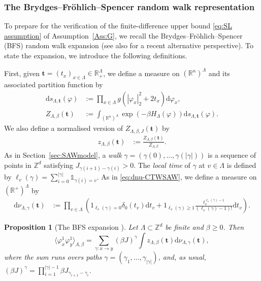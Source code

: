 \documentclass[11pt,a4paper]{article}
\numberwithin{equation}{section}
\theoremstyle{plain}
\newtheorem{Prop}[Thm]{Proposition}
\theoremstyle{definition}
\newcommand\1{\mathds{1}}
\begin{document}
\subsubsection{The Brydges--Fr\"ohlich--Spencer random walk representation}



To prepare for the verification of the finite-difference upper
bound \eqref{eq:SL assumption} of Assumption~\ref{Ass:G}, we recall
the Brydges--Fr\"ohlich--Spencer (BFS) random walk expansion \cite{BFS82} (see also \cite{Lamm23} for a recent alternative perspective).
To state the expansion, we introduce the following definitions.

First, given $\mathbf{t}=(t_x)_{x\in \Lambda}\in \mathbb R_+^\Lambda$,
we define a measure on $(\mathbb R^n)^\Lambda$ and its associated
partition function by
\begin{align}
    \mathrm{d}s_{\Lambda,\mathbf{t}}(\varphi) &:= \prod_{x\in \Lambda}  g(|\varphi_x|^2_2+2t_x)\mathrm{d}\varphi_x ,\\
    Z_{\Lambda,\beta}(\mathbf{t}) &:= \int_{(\mathbb R^n)^\Lambda}\exp (-\beta H_{\Lambda}(\varphi) ) \mathrm{d}s_{\Lambda,\mathbf{t}}(\varphi).
\end{align}
We also define a normalised version of $Z_{\Lambda,\beta,J}(\mathbf{t})$ by
\begin{align}
    z_{\Lambda,\beta}(\mathbf{t}) &:= \frac{Z_{\Lambda,\beta}(\mathbf{t})}{Z_{\Lambda,\beta}}.
\end{align}
As in Section~\ref{sec:SAWmodel}, a
\emph{walk} $\gamma=(\gamma(0),\ldots,\gamma(|\gamma|))$ is a sequence of points in $\mathbb Z^d$ satisfying
$J_{\gamma(i+1)-\gamma(i)}>0$.
The \emph{local time} of $\gamma$ at $v\in \Lambda$ is defined by
$\ell_v(\gamma) = \sum_{i = 0}^{|\gamma|}\1_{\gamma(i) = v}$.
As in \eqref{eq:dnu-CTWSAW}, we define a measure on $(\mathbb R^+)^\Lambda$ by
\begin{align}
    \mathrm{d}\nu_{\Lambda,\gamma}(\mathbf{t}) &:= \prod_{v \in \Lambda}\left(\mathrm{1}_{\ell_v(\gamma)=0}\delta_0(t_v)\mathrm{d}t_v+ \mathrm{1}_{\ell_v(\gamma)\geq 1} \frac{t_v^{\ell_v(\gamma)-1}}{(\ell_v(\gamma)-1)!}\mathrm{d}t_v\right).
\end{align}

\begin{Prop}[The BFS expansion \cite{BFS82}]
\label{prop:BFS}
Let $\Lambda \subset \mathbb Z^d$ be finite and $\beta\geq 0$. Then
  \begin{equation}
    \langle \varphi_x^1 \varphi_y^1 \rangle_{\Lambda,\beta} = \sum_{\gamma: x \rightarrow y} (\beta J)^{\gamma} \int z_{\Lambda,\beta}(\mathbf{t}) \mathrm{d}\nu_{\Lambda,\gamma}(\mathbf{t}),
\end{equation}
where the sum runs overs paths $\gamma=(\gamma_1,\ldots,\gamma_{|\gamma|})$, and, as
usual, $(\beta J)^\gamma=\prod_{i=1}^{|\gamma|-1}\beta J_{\gamma_{i+1}-\gamma_i}$.
\end{Prop}
\end{document}
